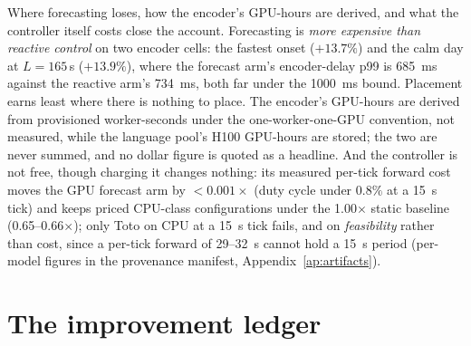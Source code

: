 Where forecasting loses, how the encoder's GPU-hours are derived, and what
the controller itself costs close the account. Forecasting is
\emph{more expensive
than reactive control} on two encoder cells: the fastest onset ($+13.7\%$) and
the calm day at $L{=}165$\,\si{\second} ($+13.9\%$), where the forecast arm's
encoder-delay p99 is \SI{685}{\milli\second} against the reactive arm's
\SI{734}{\milli\second}, both far under the \SI{1000}{\milli\second}
bound. Placement earns least where there is nothing to place. The encoder's GPU-hours
are derived from provisioned worker-seconds under the one-worker-one-GPU
convention, not measured, while the language pool's H100 GPU-hours are stored;
the two are never summed, and no dollar figure is quoted as a headline. And the
controller is not free, though charging it changes nothing: its measured
per-tick forward cost moves the GPU forecast arm by $<0.001\times$ (duty cycle
under $0.8\%$ at a \SI{15}{\second} tick) and keeps priced CPU-class
configurations under the 1.00$\times$ static baseline (0.65--0.66$\times$);
only Toto on CPU at a \SI{15}{\second} tick fails, and on \emph{feasibility}
rather than cost, since a per-tick forward of 29--\SI{32}{\second} cannot hold
a \SI{15}{\second} period (per-model figures in the provenance manifest,
Appendix~\ref{ap:artifacts}).

\section{The improvement ledger}
\label{sec:cl-ledger}

